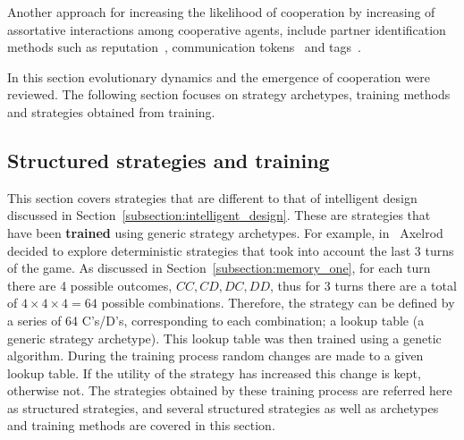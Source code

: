 \documentclass{article}
\theoremstyle{definition}
\begin{document}
Another approach for increasing the likelihood of cooperation by increasing of
assortative interactions among cooperative agents, include partner identification
methods such as reputation~\cite{Janssen2006, Nowak1998, Suzuki2005},
communication tokens~\cite{Miller2002} and tags~\cite{Choi2006, Hales2000,
Miller2002, Riolo2001}.

In this section evolutionary dynamics and the emergence of cooperation were
reviewed. The following section focuses on strategy archetypes, training methods
and strategies obtained from training.

\subsection{Structured strategies and training}
\label{section:structured_strategies}

This section covers strategies that are different to that of intelligent design discussed
in Section~\ref{subsection:intelligent_design}. These are strategies that have
been \textbf{trained} using generic strategy archetypes. For example,
in~\cite{Axelrod1987} Axelrod decided to explore deterministic strategies that
took into account the last 3 turns of the game. As discussed in
Section~\ref{subsection:memory_one}, for each turn there are 4 possible outcomes,
\(CC, CD, DC, DD\), thus for 3 turns there are a total of
\(4\times4\times4=64\) possible combinations. Therefore, the strategy can be
defined by a series of 64 C's/D's, corresponding to each combination; a lookup table
(a generic strategy archetype). This lookup table was then trained using a
genetic algorithm. During the training process random changes are made to a
given lookup table. If the utility of the strategy has increased this
change is kept, otherwise not. The strategies obtained by these training process are
referred here as structured strategies, and several structured strategies as
well as archetypes and training methods are covered in this section.
\end{document}
